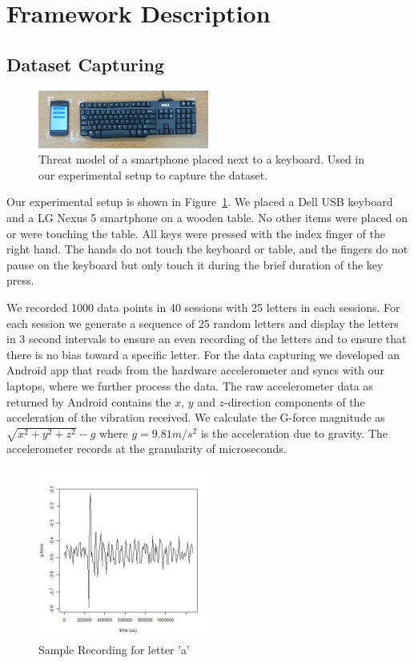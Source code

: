 \documentclass[11pt,conference]{IEEEtran}
\begin{document}
\section{Framework Description}

\subsection{Dataset Capturing}
\label{sec:dataset-capturing}
\begin{figure}
\centering
\includegraphics[width=0.5\textwidth]{img/setup}
\caption{Threat model of a smartphone placed next to a keyboard. Used in our experimental setup to capture the dataset.
}
\label{fig:setup}
\end{figure}

\noindent Our experimental setup is shown in Figure~\ref{fig:setup}. We placed a Dell USB keyboard and a LG Nexus 5 smartphone on a wooden table. No other items were placed on or were touching the table. All keys were pressed with the index finger of the right hand. The hands do not touch the keyboard or table, and the fingers do not pause on the keyboard but only touch it during the brief duration of the key press.

We recorded 1000 data points in 40 sessions with 25 letters in each sessions. For each session we generate a sequence of 25 random letters and display the letters in 3 second intervals to ensure an even recording of the letters and to ensure that there is no bias toward a specific letter. For the data capturing we developed an Android app that reads from the hardware accelerometer and syncs with our laptops, where we further process the data. The raw accelerometer data as returned by Android contains the $x$, $y$ and $z$-direction components of the acceleration of the vibration received. We calculate the G-force magnitude as $\sqrt{x^2+y^2+z^2}-g$ where $g = 9.81 m/s^2$ is the acceleration due to gravity. The accelerometer records at the granularity of microseconds.

\begin{figure}
\centering
\includegraphics[width=0.5\textwidth]{img/a_162}
\caption{Sample Recording for letter 'a'}
\label{fig:signal-a}
\end{figure}
\end{document}
